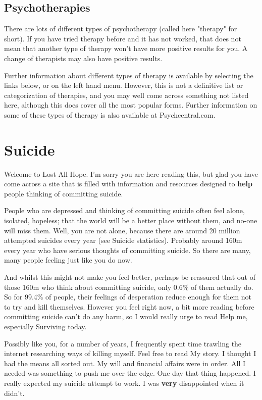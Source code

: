 \documentclass[12pt]{article}
\begin{document}
\subsection{Psychotherapies}

There are lots of different types of psychotherapy (called here "therapy" for short). If you have tried therapy before and it has not worked, that does not mean that another type of therapy won't have more positive results for you. A change of therapists may also have positive results.

Further information about different types of therapy is available by selecting the links below, or on the left hand menu. However, this is not a definitive list or categorization of therapies, and you may well come across something not listed here, although this does cover all the most popular forms. Further information on some of these types of therapy is also available at Psychcentral.com.

\section{Suicide}

Welcome to Lost All Hope. I’m sorry you are here reading this, but glad you have come across a site that is filled with information and resources designed to \textbf{help} people thinking of committing suicide.

People who are depressed and thinking of committing suicide often feel alone, isolated, hopeless; that the world will be a better place without them, and no-one will miss them. Well, you are not alone, because there are around 20 million attempted suicides every year (see Suicide statistics). Probably around 160m every year who have serious thoughts of committing suicide. So there are many, many people feeling just like you do now.

And whilst this might not make you feel better, perhaps be reassured that out of those 160m who think about committing suicide, only 0.6\% of them actually do. So for 99.4\% of people, their feelings of desperation reduce enough for them not to try and kill themselves. However you feel right now, a bit more reading before committing suicide can’t do any harm, so I would really urge to read Help me, especially Surviving today.

Possibly like you, for a number of years, I frequently spent time trawling the internet researching ways of killing myself. Feel free to read My story. I thought I had the means all sorted out. My will and financial affairs were in order. All I needed was something to push me over the edge. One day that thing happened. I really expected my suicide attempt to work. I was \textbf{very} disappointed when it didn’t.
\end{document}
